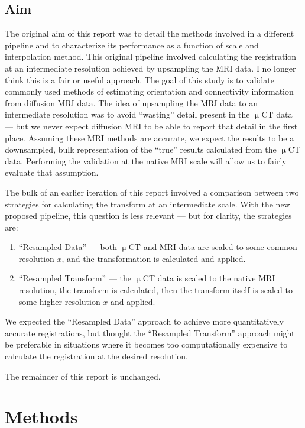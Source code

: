 \documentclass[11pt]{article}
\begin{document}
\subsection{Aim}
The original aim of this report was to detail the methods involved in a
different pipeline and to characterize its performance as a function of scale
and interpolation method. This original pipeline involved calculating the
registration at an intermediate resolution achieved by upsampling the MRI
data. I no longer think this is a fair or useful approach. The goal of this
study is to validate commonly used methods of estimating orientation and
connectivity information from diffusion MRI data. The idea of upsampling the MRI
data to an intermediate resolution was to avoid ``wasting'' detail present in
the $\upmu$CT data --- but we never expect diffusion MRI to be able to report
that detail in the first place. Assuming these MRI methods are accurate, we
expect the results to be a downsampled, bulk representation of the ``true''
results calculated from the $\upmu$CT data. Performing the validation at
the native MRI scale will allow us to fairly evaluate that assumption. 

The bulk of an earlier iteration of this report involved a comparison between
two strategies for calculating the transform at an intermediate scale. With the
new proposed pipeline, this question is less relevant --- but for clarity, the
strategies are:

\begin{enumerate}
\item ``Resampled Data'' --- both $\upmu$CT and MRI data are scaled to some common resolution $x$,
  and the transformation is calculated and applied.
\item ``Resampled Transform'' --- the $\upmu$CT data is scaled to the native MRI resolution,
  the transform is calculated, then the transform itself is scaled to some higher resolution $x$
  and applied. 
\end{enumerate}

We expected the ``Resampled Data'' approach to achieve more quantitatively
accurate registrations, but thought the ``Resampled Transform'' approach might
be preferable in situations where it becomes too computationally expensive to
calculate the registration at the desired resolution.

The remainder of this report is unchanged. 

\section{Methods}
\end{document}
